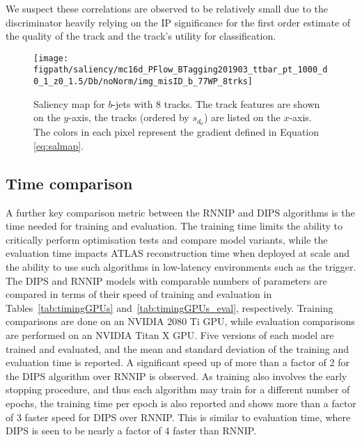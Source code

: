 We suspect these correlations are observed to be relatively small due to the discriminator heavily relying on the IP significance for the first order estimate of the quality of the track and the track's utility for classification.

\begin{figure}[htbp!]
    \centering
    \texttt{[image: \\figpath/saliency/mc16d\_PFlow\_BTagging201903\_ttbar\_pt\_1000\_d0\_1\_z0\_1.5/Db/noNorm/img\_misID\_b\_77WP\_8trks]}
    \caption{Saliency map for $b$-jets with 8 tracks. The track features are shown on the $y$-axis, the tracks (ordered by $s_{d_0}$) are listed on the $x$-axis. The colors in each pixel represent the gradient defined in Equation \ref{eq:salmap}. }
    \label{fig:saliency}
\end{figure}


\subsection{Time comparison}
\label{subsec:timing}

A further key comparison metric between the RNNIP and DIPS algorithms is the time needed for training and evaluation. 
The training time limits the ability to critically perform optimisation tests and compare model variants, while the evaluation time impacts ATLAS reconstruction time when deployed at scale and the ability to use such algorithms in low-latency environments such as the trigger. 
The DIPS and RNNIP models with comparable numbers of parameters are compared in terms of their speed of training and evaluation in Tables~\ref{tab:timingGPUs} and~\ref{tab:timingGPUs_eval}, respectively. 
Training comparisons are done on an NVIDIA 2080 Ti GPU, while evaluation comparisons are performed on an NVIDIA Titan X GPU. 
Five versions of each model are trained and evaluated, and the mean and standard deviation of the training and evaluation time is reported. 
A significant speed up of more than a factor of 2 for the DIPS algorithm over RNNIP is observed. 
As training also involves the early stopping procedure, and thus each algorithm may train for a different number of epochs, the training time per epoch is also reported and shows more than a factor of 3 faster speed for DIPS over RNNIP. 
This is similar to evaluation time, where DIPS is seen to be nearly a factor of 4 faster than RNNIP.

